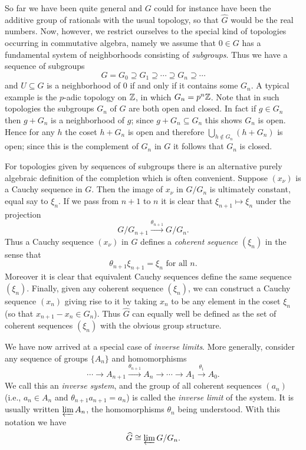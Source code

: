 So far we have been quite general and $G$ could for instance have been the additive group of rationals with the usual topology, so that $\widehat{G}$ would be the real numbers. Now, however, we restrict ourselves to the special kind of topologies occurring in commutative algebra, namely we assume that $0 \in G$ has a fundamental system of neighborhoods consisting of \emph{subgroups}. Thus we have a sequence of subgroups
\[
    G = G_0 \supseteq G_1 \supseteq \cdots \supseteq G_n \supseteq \cdots
\]
and $U \subseteq G$ is a neighborhood of $0$ if and only if it contains some $G_n$. A typical example is the $p$-adic topology on $\mathbb{Z}$, in which $G_n = p^n\mathbb{Z}$. Note that in such topologies the subgroups $G_n$ of $G$ are both open and closed. In fact if $g \in G_n$ then $g + G_n$ is a neighborhood of $g$; since $g + G_n \subseteq G_n$ this shows $G_n$ is open. Hence for any $h$ the coset $h + G_n$ is open and therefore $\bigcup_{h \notin G_n} (h + G_n)$ is open; since this is the complement of $G_n$ in $G$ it follows that $G_n$ is closed.

For topologies given by sequences of subgroups there is an alternative purely algebraic definition of the completion which is often convenient. Suppose $(x_\nu)$ is a Cauchy sequence in $G$. Then the image of $x_\nu$ in $G/G_n$ is ultimately constant, equal say to $\xi_n$. If we pass from $n + 1$ to $n$ it is clear that $\xi_{n+1} \mapsto \xi_n$ under the projection
\[
    G/G_{n+1} \stackrel{\theta_{n+1}}{\longrightarrow} G/G_n.
\]
Thus a Cauchy sequence $(x_\nu)$ in $G$ defines a \emph{coherent sequence} $(\xi_n)$ in the sense that
\[
    \theta_{n+1}\xi_{n+1} = \xi_n \text{ for all } n.
\]
Moreover it is clear that equivalent Cauchy sequences define the same sequence $(\xi_n)$. Finally, given any coherent sequence $(\xi_n)$, we can construct a Cauchy sequence $(x_n)$ giving rise to it by taking $x_n$ to be any element in the coset $\xi_n$ (so that $x_{n+1} - x_n \in G_n$). Thus $\widehat{G}$ can equally well be defined as the set of coherent sequences $(\xi_n)$ with the obvious group structure.

We have now arrived at a special case of \emph{inverse limits}. More generally, consider any sequence of groups $\{A_n\}$ and homomorphisms
\[
    \cdots \longrightarrow A_{n+1} \xrightarrow{\theta_{n+1}} A_n \longrightarrow \cdots \longrightarrow A_1 \xrightarrow{\theta_1} A_0.
\]
We call this an \emph{inverse system}, and the group of all coherent sequences $(a_n)$ (i.e., $a_n \in A_n$ and $\theta_{n+1}a_{n+1} = a_n$) is called the \emph{inverse limit} of the system. It is usually written $\varprojlim A_n$, the homomorphisms $\theta_n$ being understood. With this notation we have
\[
    \widehat{G} \cong \varprojlim G/G_n.
\]

